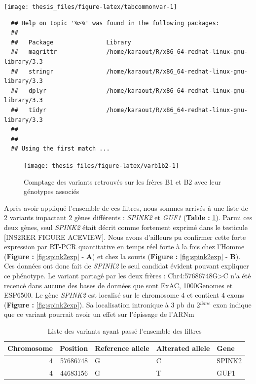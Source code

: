 \documentclass[12pt,twoside]{reedthesis}
\theoremstyle{definition}
\theoremstyle{definition}
\theoremstyle{remark}
\begin{document}
  \begin{center}\texttt{[image: thesis\_files/figure-latex/tabcommonvar-1]} \end{center}
  
  \begin{verbatim}
  ## Help on topic '%>%' was found in the following packages:
  ## 
  ##   Package               Library
  ##   magrittr              /home/karaout/R/x86_64-redhat-linux-gnu-library/3.3
  ##   stringr               /home/karaout/R/x86_64-redhat-linux-gnu-library/3.3
  ##   dplyr                 /home/karaout/R/x86_64-redhat-linux-gnu-library/3.3
  ##   tidyr                 /home/karaout/R/x86_64-redhat-linux-gnu-library/3.3
  ## 
  ## 
  ## Using the first match ...
  \end{verbatim}
  
  \begin{figure}
  
  {\centering \texttt{[image: thesis\_files/figure-latex/varb1b2-1]} 
  
  }
  
  \caption[Comptage des variants retrouvés sur les frères B1 et B2 avec leur génotypes associés]{Comptage des variants retrouvés sur les frères B1 et B2 avec leur génotypes associés}\label{fig:varb1b2}
  \end{figure}
  
  Après avoir appliqué l'ensemble de ces filtres, nous sommes arrivés à
  une liste de 2 variants impactant 2 gènes différents : \emph{SPINK2} et
  \emph{GUF1} (\textbf{Table : }\ref{tab:passingfiltervar}). Parmi ces
  deux gènes, seul \emph{SPINK2} était décrit comme fortement exprimé dans
  le testicule {[}INS2RER FIGURE ACEVIEW{]}. Nous avons d'ailleurs pu
  confirmer cette forte expression par RT-PCR quantitative en temps réel
  forte à la fois chez l'Homme (\textbf{Figure : }\ref{fig:spink2exp} -
  \textbf{A}) et chez la souris (\textbf{Figure : }\ref{fig:spink2exp} -
  \textbf{B}). Ces données ont donc fait de \emph{SPINK2} le seul candidat
  évident pouvant expliquer ce phénotype. Le variant partagé par les deux
  frères : Chr4:57686748G\textgreater{}C n'a été recencé dans aucune des
  bases de données que sont ExAC, 1000Genomes et ESP6500. Le gène
  \emph{SPINK2} est localisé sur le chromosome 4 et contient 4 exons
  (\textbf{Figure : }\ref{fig:spink2exp}). Sa localisation intronique à 3
  pb du 2\(^{ième}\) exon indique que ce variant pourrait avoir un effet
  sur l'épissage de l'ARNm
  
  \begin{table}
  
  \caption{\label{tab:passingfiltervar}Liste des variants ayant passé l'ensemble des filtres}
  \centering
  \begin{tabular}[t]{r|r|l|l|l}
  \hline
  Chromosome & Position & Reference allele & Alterated allele & Gene\\
  \hline
  4 & 57686748 & G & C & SPINK2\\
  \hline
  4 & 44683156 & G & T & GUF1\\
  \hline
  \end{tabular}
  \end{table}
  
\end{document}
